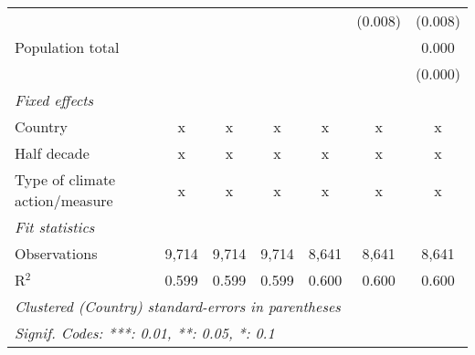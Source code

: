 \begin{tabular}{lcccccc}
                                              &              &               &               &               & (0.008)       & (0.008)\\   
   Population total                           &              &               &               &               &               & 0.000\\   
                                              &              &               &               &               &               & (0.000)\\   
   \emph{Fixed effects}\\
   Country                                    & x            & x             & x             & x             & x             & x\\  
   Half decade                                & x            & x             & x             & x             & x             & x\\  
   Type of climate action/measure             & x            & x             & x             & x             & x             & x\\  
   \midrule \emph{Fit statistics}\\
   Observations                               & 9,714        & 9,714         & 9,714         & 8,641         & 8,641         & 8,641\\  
   R$^2$                                      & 0.599        & 0.599         & 0.599         & 0.600         & 0.600         & 0.600\\  
   \midrule
   \multicolumn{7}{l}{\emph{Clustered (Country) standard-errors in parentheses}}\\
   \multicolumn{7}{l}{\emph{Signif. Codes: ***: 0.01, **: 0.05, *: 0.1}}\\
\end{tabular}
\par\endgroup


